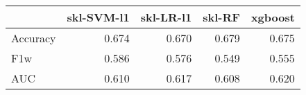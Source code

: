 \begin{tabular}{lrrrr}
\toprule
{} &  skl-SVM-l1 &  skl-LR-l1 &  skl-RF &  xgboost \\
\midrule
Accuracy &       0.674 &      0.670 &   0.679 &    0.675 \\
F1w      &       0.586 &      0.576 &   0.549 &    0.555 \\
AUC      &       0.610 &      0.617 &   0.608 &    0.620 \\
\bottomrule
\end{tabular}
